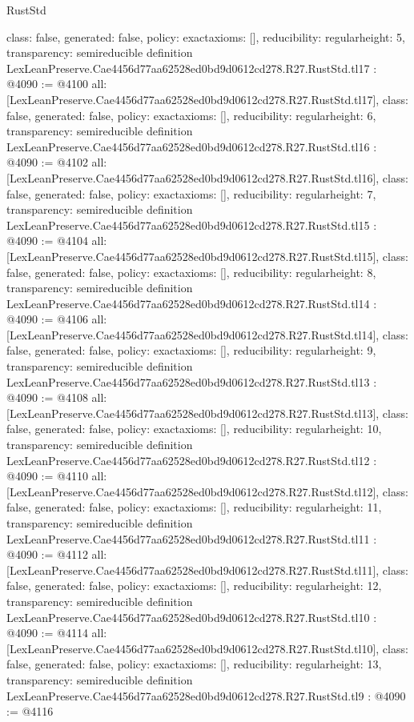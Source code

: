 \begin{lexlean}{RustStd}
\begin{coremodule}
{  class: false,
  generated: false,
  policy: exact{axioms: []},
  reducibility: regular{height: 5},
  transparency: semireducible
}
definition LexLeanPreserve.Cae4456d77aa62528ed0bd9d0612cd278.R27.RustStd.tl17 : @4090 := @4100 {
  all: [LexLeanPreserve.Cae4456d77aa62528ed0bd9d0612cd278.R27.RustStd.tl17],
  class: false,
  generated: false,
  policy: exact{axioms: []},
  reducibility: regular{height: 6},
  transparency: semireducible
}
definition LexLeanPreserve.Cae4456d77aa62528ed0bd9d0612cd278.R27.RustStd.tl16 : @4090 := @4102 {
  all: [LexLeanPreserve.Cae4456d77aa62528ed0bd9d0612cd278.R27.RustStd.tl16],
  class: false,
  generated: false,
  policy: exact{axioms: []},
  reducibility: regular{height: 7},
  transparency: semireducible
}
definition LexLeanPreserve.Cae4456d77aa62528ed0bd9d0612cd278.R27.RustStd.tl15 : @4090 := @4104 {
  all: [LexLeanPreserve.Cae4456d77aa62528ed0bd9d0612cd278.R27.RustStd.tl15],
  class: false,
  generated: false,
  policy: exact{axioms: []},
  reducibility: regular{height: 8},
  transparency: semireducible
}
definition LexLeanPreserve.Cae4456d77aa62528ed0bd9d0612cd278.R27.RustStd.tl14 : @4090 := @4106 {
  all: [LexLeanPreserve.Cae4456d77aa62528ed0bd9d0612cd278.R27.RustStd.tl14],
  class: false,
  generated: false,
  policy: exact{axioms: []},
  reducibility: regular{height: 9},
  transparency: semireducible
}
definition LexLeanPreserve.Cae4456d77aa62528ed0bd9d0612cd278.R27.RustStd.tl13 : @4090 := @4108 {
  all: [LexLeanPreserve.Cae4456d77aa62528ed0bd9d0612cd278.R27.RustStd.tl13],
  class: false,
  generated: false,
  policy: exact{axioms: []},
  reducibility: regular{height: 10},
  transparency: semireducible
}
definition LexLeanPreserve.Cae4456d77aa62528ed0bd9d0612cd278.R27.RustStd.tl12 : @4090 := @4110 {
  all: [LexLeanPreserve.Cae4456d77aa62528ed0bd9d0612cd278.R27.RustStd.tl12],
  class: false,
  generated: false,
  policy: exact{axioms: []},
  reducibility: regular{height: 11},
  transparency: semireducible
}
definition LexLeanPreserve.Cae4456d77aa62528ed0bd9d0612cd278.R27.RustStd.tl11 : @4090 := @4112 {
  all: [LexLeanPreserve.Cae4456d77aa62528ed0bd9d0612cd278.R27.RustStd.tl11],
  class: false,
  generated: false,
  policy: exact{axioms: []},
  reducibility: regular{height: 12},
  transparency: semireducible
}
definition LexLeanPreserve.Cae4456d77aa62528ed0bd9d0612cd278.R27.RustStd.tl10 : @4090 := @4114 {
  all: [LexLeanPreserve.Cae4456d77aa62528ed0bd9d0612cd278.R27.RustStd.tl10],
  class: false,
  generated: false,
  policy: exact{axioms: []},
  reducibility: regular{height: 13},
  transparency: semireducible
}
definition LexLeanPreserve.Cae4456d77aa62528ed0bd9d0612cd278.R27.RustStd.tl9 : @4090 := @4116 {
}
\end{coremodule}
\end{lexlean}
